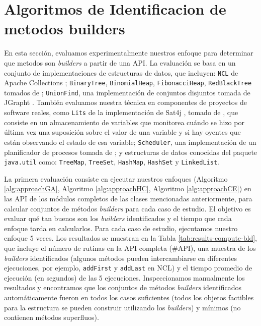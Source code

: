 \section{Algoritmos de Identificacion de metodos builders}

En esta sección, evaluamos experimentalmente nuestros enfoque para determinar que metodos son \emph{builders} a partir de una API. La evaluación se basa en un conjunto de implementaciones de estructuras de datos, que incluyen: \verb"NCL" de Apache Collections \cite{apache}; \verb"BinaryTree", \verb"BinomialHeap", \verb"FibonacciHeap", \verb"RedBlackTree" tomados de \cite{Visser:2006}; \verb"UnionFind", una implementación de conjuntos disjuntos tomada de JGrapht \cite{jgrapht}. También evaluamos nuestra técnica en componentes de proyectos de software reales, como \verb"Lits" de la implementación de Sat4j \cite{sat4j}, tomado de \cite{Loncaric:2018}, que consiste en un almacenamiento de variables que monitorea cuándo se hizo por última vez una suposición sobre el valor de una variable y si hay oyentes que están observando el estado de esa variable; \verb"Scheduler", una implementación de un planificador de procesos tomada de \cite{sir}; y estructuras de datos conocidas del paquete \verb"java.util" como: \verb"TreeMap", \verb"TreeSet", \verb"HashMap", \verb"HashSet" y \verb"LinkedList".


La primera evaluación consiste en ejecutar nuestros enfoques (Algoritmo \ref{alg:approachGA}, Algoritmo \ref{alg:approachHC}, Algoritmo \ref{alg:approachCE}) en las API de los módulos completos de las clases mencionadas anteriormente, para calcular conjuntos de métodos \emph{builders} para cada caso de estudio. El objetivo es evaluar qué tan buenos son los \emph{builders} identificados y el tiempo que cada enfoque tarda en calcularlos. Para cada caso de estudio, ejecutamos nuestro enfoque 5 veces. Los resultados se muestran en la Tabla \ref{tab:results-compute-bld}, que incluye el número de rutinas en la API completa (\#API), una muestra de los \emph{builders} identificados (algunos métodos pueden intercambiarse en diferentes ejecuciones, por ejemplo, \texttt{addFirst} y \texttt{addLast} en NCL) y el tiempo promedio de ejecución (en segundos) de las 5 ejecuciones. Inspeccionamos manualmente los resultados y encontramos que los conjuntos de métodos \emph{builders} identificados automáticamente fueron en todos los casos suficientes (todos los objetos factibles para la estructura se pueden construir utilizando los \emph{builders}) y mínimos (no contienen métodos superfluos).

